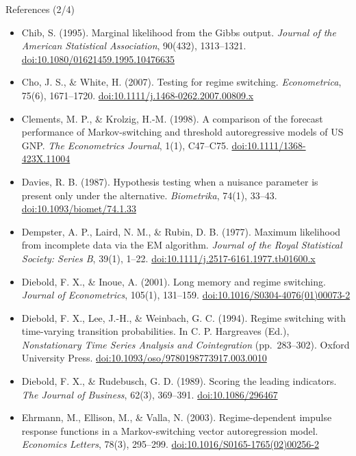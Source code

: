 \begin{frame}{References (2/4)}
\itemsize{\tiny}
\begin{itemize}
    \item Chib, S. (1995). Marginal likelihood from the Gibbs output. \textit{Journal of the American Statistical Association}, 90(432), 1313--1321. \href{https://doi.org/10.1080/01621459.1995.10476635}{doi:10.1080/01621459.1995.10476635}
    \item Cho, J. S., \& White, H. (2007). Testing for regime switching. \textit{Econometrica}, 75(6), 1671--1720. \href{https://doi.org/10.1111/j.1468-0262.2007.00809.x}{doi:10.1111/j.1468-0262.2007.00809.x}
    \item Clements, M. P., \& Krolzig, H.-M. (1998). A comparison of the forecast performance of Markov-switching and threshold autoregressive models of US GNP. \textit{The Econometrics Journal}, 1(1), C47--C75. \href{https://doi.org/10.1111/1368-423X.11004}{doi:10.1111/1368-423X.11004}
    \item Davies, R. B. (1987). Hypothesis testing when a nuisance parameter is present only under the alternative. \textit{Biometrika}, 74(1), 33--43. \href{https://doi.org/10.1093/biomet/74.1.33}{doi:10.1093/biomet/74.1.33}
    \item Dempster, A. P., Laird, N. M., \& Rubin, D. B. (1977). Maximum likelihood from incomplete data via the EM algorithm. \textit{Journal of the Royal Statistical Society: Series B}, 39(1), 1--22. \href{https://doi.org/10.1111/j.2517-6161.1977.tb01600.x}{doi:10.1111/j.2517-6161.1977.tb01600.x}
    \item Diebold, F. X., \& Inoue, A. (2001). Long memory and regime switching. \textit{Journal of Econometrics}, 105(1), 131--159. \href{https://doi.org/10.1016/S0304-4076(01)00073-2}{doi:10.1016/S0304-4076(01)00073-2}
    \item Diebold, F. X., Lee, J.-H., \& Weinbach, G. C. (1994). Regime switching with time-varying transition probabilities. In C. P. Hargreaves (Ed.), \textit{Nonstationary Time Series Analysis and Cointegration} (pp.\ 283--302). Oxford University Press. \href{https://doi.org/10.1093/oso/9780198773917.003.0010}{doi:10.1093/oso/9780198773917.003.0010}
    \item Diebold, F. X., \& Rudebusch, G. D. (1989). Scoring the leading indicators. \textit{The Journal of Business}, 62(3), 369--391. \href{https://doi.org/10.1086/296467}{doi:10.1086/296467}
    \item Ehrmann, M., Ellison, M., \& Valla, N. (2003). Regime-dependent impulse response functions in a Markov-switching vector autoregression model. \textit{Economics Letters}, 78(3), 295--299. \href{https://doi.org/10.1016/S0165-1765(02)00256-2}{doi:10.1016/S0165-1765(02)00256-2}

\end{itemize}
\end{frame}

